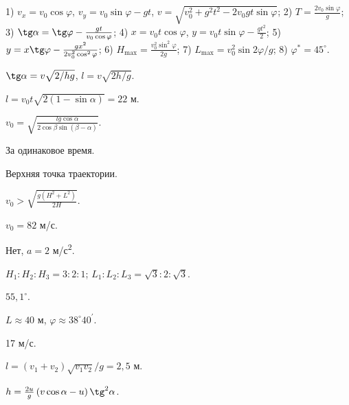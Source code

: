 \begin{Answer}{26}
1) $v_x = v_0 \cos \varphi$, $v_y = v_0 \sin \varphi - gt$, $v = \sqrt{v_{0}^{2} + g^2 t^2 - 2v_{0}gt \sin \varphi}$; 2) $T = \frac{2v_{0}\sin \varphi}{g}$; 3) $ \tg \alpha = \tg \varphi - \frac{gt}{v_0 \cos \varphi}$; 4) $x = v_0 t \cos \varphi$, $y = v_0 t \sin \varphi - \frac{gt^2}{2}$; 5) $y = x \tg \varphi - \frac{gx^2}{2v_{0}^{2} \cos^2 \varphi} $; 6) $H_{\max} = \frac{v_{0}^{2} \sin^2 \varphi}{2g}$; 7) $L_{\max} = v_{0}^2 \sin 2 \varphi / g$; 8) $\varphi^{*} = 45^{\circ}$.
\end{Answer}
\begin{Answer}{27}
$\tg \alpha = v \sqrt{2/hg}$, $l = v \sqrt{2h/g}$.
\end{Answer}
\begin{Answer}{28}
$l = v_0 t \sqrt{2(1-\sin \alpha)} = 22$ м.
\end{Answer}
\begin{Answer}{29}
$v_0 = \sqrt{\frac{lg \cos \alpha}{2 \cos \beta \sin \left( \beta - \alpha \right)}}$.
\end{Answer}
\begin{Answer}{30}
За одинаковое время.
\end{Answer}
\begin{Answer}{31}
Верхняя точка траектории.
\end{Answer}
\begin{Answer}{32}
$v_0 > \sqrt{\frac{g(H^2+L^2)}{2H}}$.
\end{Answer}
\begin{Answer}{33}
$v_0 = 82$ м/с.
\end{Answer}
\begin{Answer}{34}
Нет, $a = 2$ м/с\textsuperscript{2}.
\end{Answer}
\begin{Answer}{35}
$H_1 : H_2 : H_3 = 3 : 2 : 1$; $L_1 : L_2 : L_3 = \sqrt{3} : 2 : \sqrt{3}$.
\end{Answer}
\begin{Answer}{36}
$55,1^{ \circ }$.
\end{Answer}
\begin{Answer}{37}
$L \approx 40$ м, $\varphi \approx 38^{\circ}40^\prime$.
\end{Answer}
\begin{Answer}{38}
17 м/с.
\end{Answer}
\begin{Answer}{39}
$l = (v_1 + v_2)\sqrt{v_1 v_2}/g = 2,5$ м.
\end{Answer}
\begin{Answer}{40}
$h = \frac{2u}{g}\left( v \cos \alpha - u \right) \tg^2 \alpha$.
\end{Answer}
